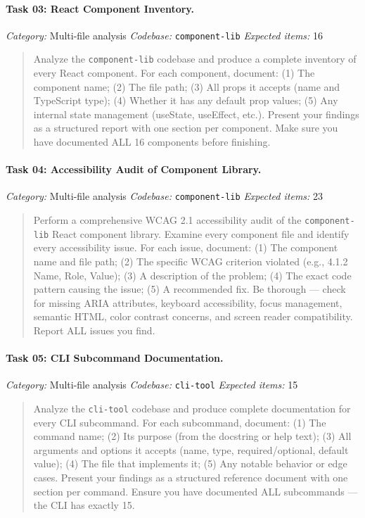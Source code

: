 \paragraph{Task 03: React Component Inventory.}
\textit{Category:} Multi-file analysis \quad
\textit{Codebase:} \texttt{component-lib} \quad
\textit{Expected items:} 16

\begin{quote}
Analyze the \texttt{component-lib} codebase and produce a complete inventory of every React component. For each component, document: (1) The component name; (2) The file path; (3) All props it accepts (name and TypeScript type); (4) Whether it has any default prop values; (5) Any internal state management (useState, useEffect, etc.). Present your findings as a structured report with one section per component. Make sure you have documented ALL 16 components before finishing.
\end{quote}

\paragraph{Task 04: Accessibility Audit of Component Library.}
\textit{Category:} Multi-file analysis \quad
\textit{Codebase:} \texttt{component-lib} \quad
\textit{Expected items:} 23

\begin{quote}
Perform a comprehensive WCAG 2.1 accessibility audit of the \texttt{component-lib} React component library. Examine every component file and identify every accessibility issue. For each issue, document: (1) The component name and file path; (2) The specific WCAG criterion violated (e.g., 4.1.2 Name, Role, Value); (3) A description of the problem; (4) The exact code pattern causing the issue; (5) A recommended fix. Be thorough --- check for missing ARIA attributes, keyboard accessibility, focus management, semantic HTML, color contrast concerns, and screen reader compatibility. Report ALL issues you find.
\end{quote}

\paragraph{Task 05: CLI Subcommand Documentation.}
\textit{Category:} Multi-file analysis \quad
\textit{Codebase:} \texttt{cli-tool} \quad
\textit{Expected items:} 15

\begin{quote}
Analyze the \texttt{cli-tool} codebase and produce complete documentation for every CLI subcommand. For each subcommand, document: (1) The command name; (2) Its purpose (from the docstring or help text); (3) All arguments and options it accepts (name, type, required/optional, default value); (4) The file that implements it; (5) Any notable behavior or edge cases. Present your findings as a structured reference document with one section per command. Ensure you have documented ALL subcommands --- the CLI has exactly 15.
\end{quote}


